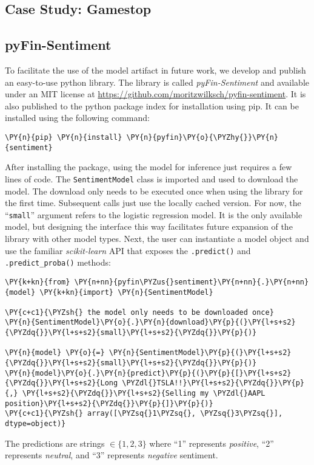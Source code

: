 

\subsection{Case Study: Gamestop}

\subsection{pyFin-Sentiment}
To facilitate the use of the model artifact in future work, we develop and publish an easy-to-use python library. The library is called \emph{pyFin-Sentiment} and available under an MIT license at \url{https://github.com/moritzwilksch/pyfin-sentiment}. It is also published to the python package index for installation using pip. It can be installed using the following command:

\begin{Verbatim}[commandchars=\\\{\}]
\PY{n}{pip} \PY{n}{install} \PY{n}{pyfin}\PY{o}{\PYZhy{}}\PY{n}{sentiment}
\end{Verbatim}

After installing the package, using the model for inference just requires a few lines of code. The \texttt{SentimentModel} class is imported and used to download the model. The download only needs to be executed once when using the library for the first time. Subsequent calls just use the locally cached version. For now, the ``\texttt{small}'' argument refers to the logistic regression model. It is the only available model, but designing the interface this way facilitates future expansion of the library with other model types. Next, the user can instantiate a model object and use the familiar \emph{scikit-learn} API that exposes the \texttt{.predict()} and \texttt{.predict\_proba()} methods:



\begin{Verbatim}[commandchars=\\\{\}]
\PY{k+kn}{from} \PY{n+nn}{pyfin\PYZus{}sentiment}\PY{n+nn}{.}\PY{n+nn}{model} \PY{k+kn}{import} \PY{n}{SentimentModel}

\PY{c+c1}{\PYZsh{} the model only needs to be downloaded once}
\PY{n}{SentimentModel}\PY{o}{.}\PY{n}{download}\PY{p}{(}\PY{l+s+s2}{\PYZdq{}}\PY{l+s+s2}{small}\PY{l+s+s2}{\PYZdq{}}\PY{p}{)}

\PY{n}{model} \PY{o}{=} \PY{n}{SentimentModel}\PY{p}{(}\PY{l+s+s2}{\PYZdq{}}\PY{l+s+s2}{small}\PY{l+s+s2}{\PYZdq{}}\PY{p}{)}
\PY{n}{model}\PY{o}{.}\PY{n}{predict}\PY{p}{(}\PY{p}{[}\PY{l+s+s2}{\PYZdq{}}\PY{l+s+s2}{Long \PYZdl{}TSLA!!}\PY{l+s+s2}{\PYZdq{}}\PY{p}{,} \PY{l+s+s2}{\PYZdq{}}\PY{l+s+s2}{Selling my \PYZdl{}AAPL position}\PY{l+s+s2}{\PYZdq{}}\PY{p}{]}\PY{p}{)}
\PY{c+c1}{\PYZsh{} array([\PYZsq{}1\PYZsq{}, \PYZsq{}3\PYZsq{}], dtype=object)}
\end{Verbatim}

The predictions are strings $\in \{1, 2, 3\}$ where ``1'' represents \emph{positive}, ``2'' represents \emph{neutral}, and ``3'' represents \emph{negative} sentiment.



